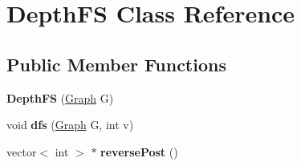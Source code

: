 \hypertarget{classDepthFS}{\section{Depth\+F\+S Class Reference}
\label{classDepthFS}
}
\subsection*{Public Member Functions}
\begin{DoxyCompactItemize}
\item 
\hypertarget{classDepthFS_ae9074fd9e5373c8541fbea0cab94b2f1}{{\bfseries Depth\+F\+S} (\hyperlink{classGraph}{Graph} G)}\label{classDepthFS_ae9074fd9e5373c8541fbea0cab94b2f1}

\item 
\hypertarget{classDepthFS_a56690791f8a6929c7abe8c6125521f6b}{void {\bfseries dfs} (\hyperlink{classGraph}{Graph} G, int v)}\label{classDepthFS_a56690791f8a6929c7abe8c6125521f6b}

\item 
\hypertarget{classDepthFS_afc479c8f742a1d1e0a01c50cf6637b85}{vector$<$ int $>$ $\ast$ {\bfseries reverse\+Post} ()}\label{classDepthFS_afc479c8f742a1d1e0a01c50cf6637b85}

\end{DoxyCompactItemize}
